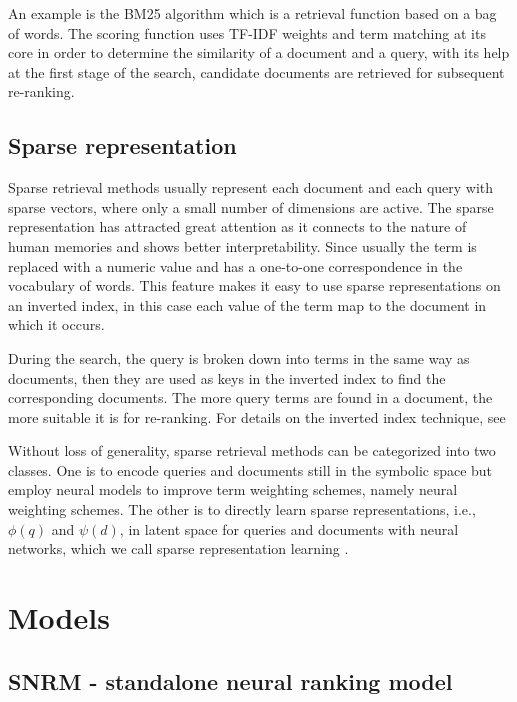 \documentclass[
    twocolumn,
]{ceurart}
\begin{document}
    An example is the BM25 \cite{bm25} algorithm which is a retrieval function based on a bag of
    words.
    The scoring function uses TF-IDF weights and term matching at its core in order to
    determine the similarity of a document and a query, with its help at the first stage of
    the search, candidate documents are retrieved for subsequent re-ranking.

    \subsection{Sparse representation}

    Sparse retrieval methods usually represent each document and each query with sparse vectors,
    where only a small number of dimensions are active.
    The sparse representation has attracted great attention as it connects to the nature of human
    memories and shows better interpretability.
    Since usually the term is replaced with a numeric value and has a one-to-one correspondence
    in the vocabulary of words.
    This feature makes it easy to use sparse representations on an inverted index, in this case
    each value of the term map to the document in which it occurs.

    During the search, the query is broken down into terms in the same way as documents, then
    they are used as keys in the inverted index to find the corresponding documents.
    The more query terms are found in a document, the more suitable it is for re-ranking.
    For details on the inverted index technique, see
    \cite{invertedIndexTechnique1, invertedIndexTechnique2}

    Without loss of generality, sparse retrieval methods can be categorized into two classes.
    One is to encode queries and documents still in the symbolic space but employ neural models
    to improve term weighting schemes, namely neural weighting schemes.
    The other is to directly learn sparse representations, i.e., $\phi(q)$ and $\psi(d)$, in
    latent space for queries and documents with neural networks, which we call sparse
    representation learning \cite{SOTA}.


    \section{Models}

    \subsection{SNRM - standalone neural ranking model}
\end{document}

